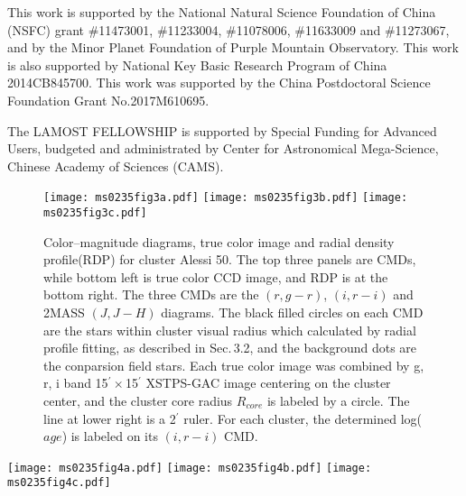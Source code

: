 \documentclass[]{raa_rb}
\begin{document}
\begin{acknowledgements}
\vspace{2ex}
This work is supported by the National Natural Science Foundation of China
(NSFC) grant \#11473001, \#11233004, \#11078006, \#11633009 and \#11273067, and by the
Minor Planet Foundation of Purple Mountain Observatory. 
This work is also supported by National Key Basic Research Program of China 2014CB845700.  
This work was supported by the China Postdoctoral Science Foundation Grant No.2017M610695.

The LAMOST FELLOWSHIP is supported by Special Funding for Advanced Users, budgeted and administrated by Center for Astronomical Mega-Science, Chinese Academy of Sciences (CAMS).



\end{acknowledgements}








 \begin{figure}
 \begin{center}
 \texttt{[image: ms0235fig3a.pdf]}
 \texttt{[image: ms0235fig3b.pdf]}
 \texttt{[image: ms0235fig3c.pdf]}
 \caption{Color--magnitude diagrams, true color image and radial density profile(RDP) for cluster Alessi 50.
The top three panels are CMDs, while bottom left is true color CCD image, and RDP is at the bottom right.
The three CMDs are the $(r, g-r)$, $(i, r-i)$ and 2MASS $(J, J-H)$ diagrams.
The black filled circles on each CMD are the stars within cluster visual radius which 
calculated by radial profile fitting, as described in Sec.\,3.2, and the background dots are 
the conparsion field stars.  
Each true color image was combined by g, r, i band 15$^{'}\times$15$^{'}$ XSTPS-GAC image centering on the cluster center, and the cluster 
core radius $R_{core}$ is labeled by a circle. The line at lower right is a 2$^{'}$ ruler.
For each cluster, the determined log($age$) is labeled on its  $(i, r-i)$ CMD.} 
 \label{fig1}
 \end{center}
 \end{figure}
 
 
 \begin{figure*}
 \begin{center}
 \texttt{[image: ms0235fig4a.pdf]}
 \texttt{[image: ms0235fig4b.pdf]}
 \texttt{[image: ms0235fig4c.pdf]}
 \caption{Same as Fig\,\ref{fig1} but for cluster Xuyi 24. It is also an example of
 second obvious clusters that are relatively compact clusters.} 
 \label{fig2}
 \end{center}
 \end{figure*}
 
\end{document}
